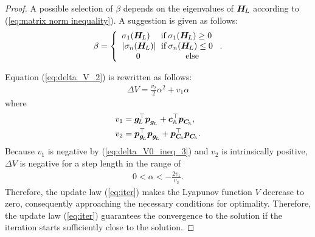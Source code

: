 \documentclass[journal]{IEEEtranTIE}
\begin{document}
\begin{proof}
A possible selection of $\beta$ depends on the eigenvalues of $\boldsymbol{H}_{\! L}$ according to (\ref{eq:matrix norm inequality}). A suggestion is given as follows:
\begin{equation}
\beta  = \left\{ {\begin{array}{*{20}{c}}
{{\sigma _1}(\mm{H}_{\! L})\,\,\,\,\,\,\;{\rm{if}}\,{\sigma _1}(\mm{H}_{\! L}) \ge 0\,}\\
{\left| {{\sigma _n}(\mm{H}_{\! L})} \right|\,\;{\rm{if}}\,{\sigma _n}(\mm{H}_{\! L}) \le 0}\\
{0\,\,\,\,\,\,\,\,\,\,\,\,\,\,\,\,\,\,\,\,\,\,\,\,\,\,\,\,\,\,\,\,{\rm{else}}}
\end{array}} \right..
\end{equation}



Equation (\ref{eq:delta_V_2}) is rewritten as follows: 
\begin{align}\label{eq:del_V2}
\Delta V = \frac{{{v_2}}}{2}{\alpha ^2} + {v_1}\alpha
\end{align}
where
\begin{subequations}
\begin{align}
{v_1} &= {\boldsymbol{g}_{\! L}^\top}\boldsymbol{p}_{\boldsymbol{g}_{\! L}} + \boldsymbol{c}_{\mathbb{A}}^\top{\boldsymbol{p}_{\boldsymbol{C}_{\!\mathbb{A}}}},\\
{v_2} &= \boldsymbol{p}_{\boldsymbol{g}_{\! L}}^\top\boldsymbol{p}_{\boldsymbol{g}_{\! L}} + \boldsymbol{p}_{\boldsymbol{C}_{\!\mathbb{A}}}^\top{\boldsymbol{p}_{\boldsymbol{C}_{\!\mathbb{A}}}}.
\end{align}
\end{subequations}
Because $v_1$ is negative by (\ref{eq:delta_V0_ineq_3}) and $v_2$ is intrinsically positive, $\Delta V$ is negative for a step length in the range of 
\begin{align}
0 < \alpha  <  - \frac{{2{v_1}}}{{{v_2}}}.
\end{align}
Therefore, the update law (\ref{eq:iter}) makes the Lyapunov function $V$ decrease to zero, consequently approaching the necessary conditions for optimality. Therefore, the update law (\ref{eq:iter}) guarantees the convergence to the solution if the iteration starts sufficiently close to the solution.
\end{proof}
\end{document}
